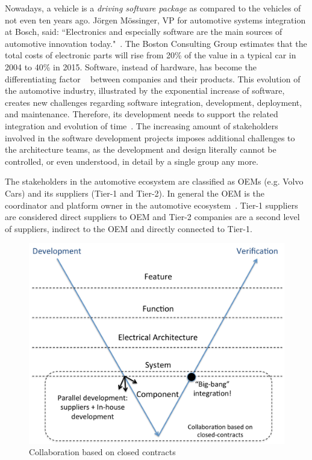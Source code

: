 Nowadays, a vehicle is a {\em driving software package} as compared to the vehicles of not even ten years ago. J\"orgen M\"ossinger, VP for automotive systems integration at Bosch, said: ``Electronics and especially software are the main sources of automotive innovation today."~\cite{Mossinger2010SoftwareAutomotive}. The Boston Consulting Group estimates that the total costs of electronic parts will rise from 20\% of the value in a typical car in 2004 to 40\% in 2015. Software, instead of hardware, has become the differentiating factor%
~\cite{ConnectedVehicle2012,hbr2015hardwaresoftware,Mossinger2010SoftwareAutomotive,Broy:2006:CAS:1134285.1134292} %
between companies and their products. This evolution of the automotive industry, illustrated by the exponential increase of software, creates new challenges regarding software integration, development, deployment, and maintenance. Therefore, its development needs to support the related integration and evolution of time~\cite{Broy:2006:CAS:1134285.1134292,qualman2009socialnomics,JansenTale2009}. The increasing amount of stakeholders involved in the software development projects imposes additional challenges to the architecture teams, as the development and design literally cannot be controlled, or even understood, in detail by a single group any more. 

The stakeholders in the automotive ecosystem are classified as OEMs (e.g. Volvo Cars) and its suppliers (Tier-1 and Tier-2). In general the OEM is the coordinator and platform owner in the automotive ecosystem~\cite{KS15}. Tier-1 suppliers are considered direct suppliers to OEM and Tier-2 companies are a second level of suppliers, indirect to the OEM and directly connected to Tier-1. %

\begin{figure}[htb]
\centering
\includegraphics[width=\columnwidth]{figure/Closed-contract-collaboration.pdf}
\caption{Collaboration based on closed contracts}
\label{fig:closedContractCollaboration}
\end{figure}

